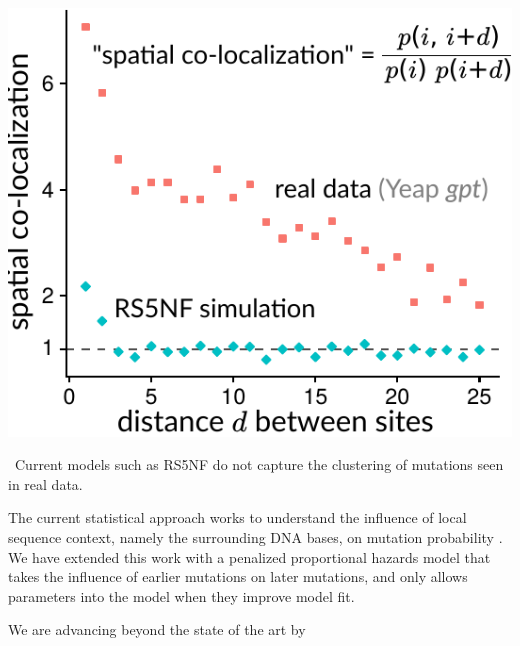 \documentclass[nobib]{tufte-handout}
\begin{document}
\begin{marginfigure}[0.2in]%
\begin{centering}
    \includegraphics[width=\textwidth]{spatial-co-localization}
\end{centering}
  \caption{\
   Current models such as RS5NF \cite{Cui2016-wz} do not capture the clustering of mutations seen in real data.
    }
  \label{FIGshm}
\end{marginfigure}%

The current statistical approach works to understand the influence of local sequence context, namely the surrounding DNA bases, on mutation probability \cite{Rogozin1992-xv,Yaari2013-dg,Cui2016-wz}.
We have extended this work with a penalized  proportional hazards model \cite{Feng2019-sj} that takes the influence of earlier mutations on later mutations, and only allows parameters into the model when they improve model fit.

We are advancing beyond the state of the art by

\newpage


\end{document}
